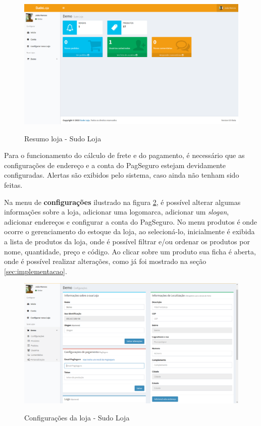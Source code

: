 \documentclass[a4paper,12pt]{monografia}
\begin{document}
\begin{figure}[H]
\centering
\caption{Resumo loja - Sudo Loja}
\centering
\includegraphics[width=15cm]{img/sistema/resumoloja.png.eps}\\
\label{fig:mainloja}
\end{figure}

Para o funcionamento do cálculo de frete e do pagamento, é necessário que as configurações de endereço e a conta do PagSeguro estejam devidamente configuradas. Alertas são exibidos pelo sistema, caso ainda não tenham sido feitas. 

Na menu de \textbf{configurações} ilustrado na figura \ref{fig:configloja}, é possível alterar algumas informações sobre a loja, adicionar uma logomarca, adicionar um \textit{slogan}, adicionar endereços e configurar a conta do PagSeguro. No menu produtos é onde ocorre o gerenciamento do estoque da loja, ao selecioná-lo, inicialmente é exibida a lista de produtos da loja, onde é possível filtrar e/ou ordenar os produtos por nome, quantidade, preço e código. Ao clicar sobre um produto sua ficha é aberta, onde é possível realizar alterações, como já foi mostrado na seção \ref{sec:implementacao}. 

\begin{figure}[H]
\centering
\caption{Configurações da loja - Sudo Loja}
\centering
\includegraphics[width=15cm]{img/sistema/configloja.png.eps}\\
\label{fig:configloja}
\end{figure}
\end{document}
